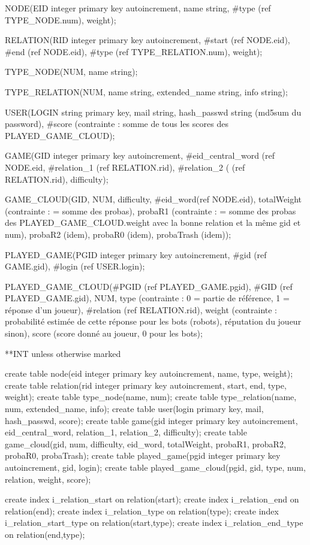 \documentclass[a4paper,11pt,french]{article}
\begin{document}
NODE(EID integer primary key autoincrement, name string, #type (ref TYPE_NODE.num), weight);

RELATION(RID integer primary key autoincrement, #start (ref NODE.eid), #end (ref NODE.eid), #type (ref TYPE_RELATION.num), weight);

TYPE_NODE(NUM, name string);

TYPE_RELATION(NUM, name string, extended_name string, info string);

USER(LOGIN string primary key, mail string, hash_passwd string (md5sum du password), #score (contrainte : somme de tous les scores des PLAYED_GAME_CLOUD);

GAME(GID integer primary key autoincrement, #eid_central_word (ref NODE.eid, #relation_1 (ref RELATION.rid), #relation_2 ( (ref RELATION.rid), difficulty);

GAME_CLOUD(GID, NUM, difficulty, #eid_word(ref NODE.eid), totalWeight (contrainte : = somme des probas), probaR1 (contrainte : = somme des probas des PLAYED_GAME_CLOUD.weight avec la bonne relation et la même gid et num), probaR2 (idem), probaR0 (idem), probaTrash (idem));

PLAYED_GAME(PGID integer primary key autoincrement, #gid (ref GAME.gid), #login (ref USER.login);

PLAYED_GAME_CLOUD(#PGID (ref PLAYED_GAME.pgid), #GID (ref PLAYED_GAME.gid), NUM, type (contrainte : 0 = partie de référence, 1 = réponse d'un joueur), #relation (ref RELATION.rid), weight (contrainte : probabilité estimée de cette réponse pour les bots (robots), réputation du joueur sinon), score (score donné au joueur, 0 pour les bots);

**INT unless otherwise marked


create table node(eid integer primary key autoincrement, name, type, weight);
create table relation(rid integer primary key autoincrement, start, end, type, weight);
create table type_node(name, num);
create table type_relation(name, num, extended_name, info);
create table user(login primary key, mail, hash_passwd, score);
create table game(gid integer primary key autoincrement, eid_central_word, relation_1, relation_2, difficulty);
create table game_cloud(gid, num, difficulty, eid_word, totalWeight, probaR1, probaR2, probaR0, probaTrash);
create table played_game(pgid integer primary key autoincrement, gid, login);
create table played_game_cloud(pgid, gid, type, num, relation, weight, score);




create index i_relation_start on relation(start);
create index i_relation_end on relation(end);
create index i_relation_type on relation(type);
create index i_relation_start_type on relation(start,type);
create index i_relation_end_type on relation(end,type);
\end{document}
